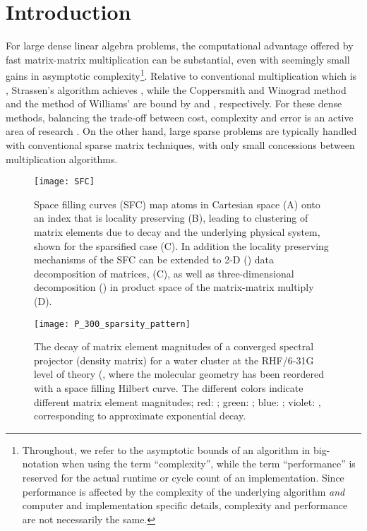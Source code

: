 

\section{Introduction}

For large dense linear algebra problems, the computational advantage offered by
fast matrix-matrix multiplication can be substantial, even with seemingly small
gains in asymptotic complexity\footnote{Throughout, we refer to the asymptotic
bounds of an algorithm in big- notation when using the term
``complexity'', while the term ``performance'' is reserved for the actual
runtime or cycle count of an implementation. Since performance is affected by
the complexity of the underlying algorithm \emph{and} computer and
implementation specific details, complexity and performance are not
necessarily the same.}.  Relative to conventional multiplication which is
, Strassen's algorithm
\cite{springerlink:10.1007/BF02165411} achieves , while the Coppersmith and Winograd method \cite{Coppersmith1990251}
and the method of Williams' \cite{Williams:2012:MMF:2213977.2214056} are bound
by  and , respectively. For these dense methods, balancing the trade-off
between cost, complexity and error is an active area of research
\cite{Demmel:1992:FastMM, Demmel:2007:FastMM, Yuster:2005:FastMM}. On the
other hand, large sparse problems are typically handled with conventional
sparse matrix techniques, with only small concessions between multiplication
algorithms.

\begin{figure}
\texttt{[image: SFC]}
\caption{\label{fig:SFC} Space filling curves (SFC) map atoms in Cartesian
space (A) onto an index that is locality preserving (B), leading to clustering
of matrix elements due to decay and the underlying physical system, shown for
the sparsified case (C). In addition the locality preserving mechanisms of the
SFC can be extended to 2-D () data decomposition of matrices, (C), as well
as three-dimensional decomposition () in product space of the
matrix-matrix multiply (D).}
\end{figure}

\begin{figure}
\texttt{[image: P\_300\_sparsity\_pattern]}
\caption{\label{fig:sparsity_pattern} The decay of matrix element magnitudes of
a converged spectral projector (density matrix) for a  water cluster at the RHF/6-31G level of
theory (, where the molecular geometry has been reordered with a
space filling Hilbert curve. The different colors indicate different matrix
element magnitudes; red: ; green: ; blue: ; violet: , corresponding to approximate exponential decay.}
\end{figure}

